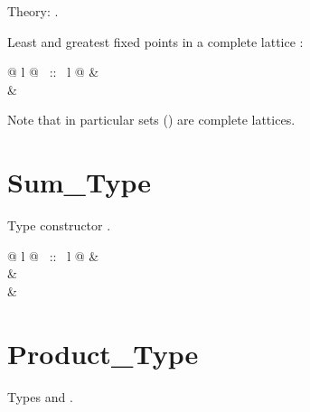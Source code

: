 \begin{isabellebody}
\begin{isamarkuptext}
Theory: .

Least and greatest fixed points in a complete lattice :

\begin{tabular}{@ {} l @ {~::~} l @ {}}
 & \\
 & \\
\end{tabular}

Note that in particular sets () are complete lattices.

\section{Sum\_Type}

Type constructor \isa{{\isacharplus}}.

\begin{tabular}{@ {} l @ {~::~} l @ {}}
 & \\
 & \\
 & 
\end{tabular}


\section{Product\_Type}

Types  and \isa{{\isasymtimes}}.


\end{isamarkuptext}
\end{isabellebody}
